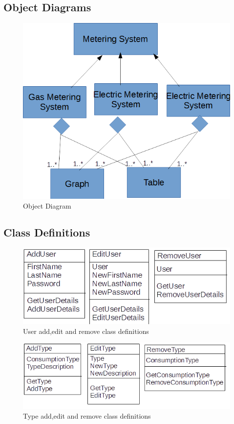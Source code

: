 \subsection{Object Diagrams}
\begin{figure}[H]
\includegraphics{./design/object diagram.png}
\caption{Object Diagram}
\end{figure}

\subsection{Class Definitions}
\begin{figure}[H]
\includegraphics{./design/userclassdefinitions.png}
\caption{User add,edit and remove class definitions}
\end{figure}

\begin{figure}[H]
\includegraphics{./design/typeclassdefinitions.png}
\caption{Type add,edit and remove class definitions}
\end{figure}

